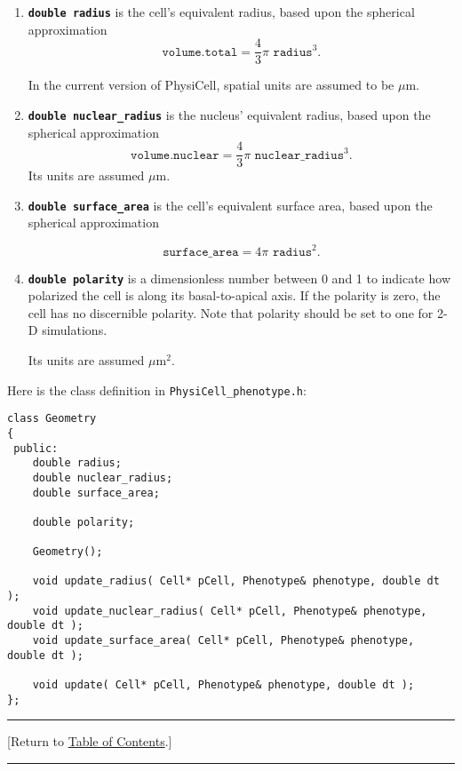 \documentclass[12pt]{article}
\newcommand{\beq}{\begin{equation}}
\newcommand{\eeq}{\end{equation}}
\newcommand{\micron}{\mu\textrm{m}}
\renewcommand{\v}{\verb}
\newcommand{\smallcode}[1]{\textbf{\texttt{#1}}}
\newcommand{\TOClink}{\begin{center}\hrule\vskip-5pt\phantom{.}\hfill[Return to \hyperlink{TOC}{Table of Contents}.]\hfill\phantom{.}\vskip3pt\hrule\end{center}}
\begin{document}
\begin{enumerate}
\item 
\smallcode{double radius} is the cell's equivalent radius, based upon the spherical approximation 
\beq
\texttt{volume.total} = \frac{4}{3} \pi \texttt{ radius}^3. 
\eeq

In the current version of PhysiCell, spatial units are assumed to be $\micron$. 

\item 
\smallcode{double nuclear\_radius} is the nucleus' equivalent radius, based upon the spherical approximation 
\beq
\texttt{volume.nuclear} = \frac{4}{3} \pi \texttt{ nuclear\_radius}^3.
\eeq
Its units are assumed $\micron$. 

\item 
\smallcode{double surface\_area} is the cell's equivalent surface area, based upon the spherical approximation 

\beq
\texttt{surface\_area} = 4 \pi \texttt{ radius}^2.
\eeq

\item 
\smallcode{double polarity} is a dimensionless number between 0 and 1 to indicate how polarized the cell is along its basal-to-apical axis. If the polarity is zero, the cell has no discernible polarity. Note that polarity should be set to one for 2-D simulations. 

Its units are assumed $\micron^2$. 
\end{enumerate}

Here is the class definition in \v|PhysiCell_phenotype.h|:
\begin{verbatim}
class Geometry
{
 public:
    double radius; 
    double nuclear_radius; 
    double surface_area; 
    
    double polarity; 
    
    Geometry();      
    
    void update_radius( Cell* pCell, Phenotype& phenotype, double dt );      
    void update_nuclear_radius( Cell* pCell, Phenotype& phenotype, double dt );      
    void update_surface_area( Cell* pCell, Phenotype& phenotype, double dt );      
    
    void update( Cell* pCell, Phenotype& phenotype, double dt );      
};
\end{verbatim}

\TOClink
\end{document}
